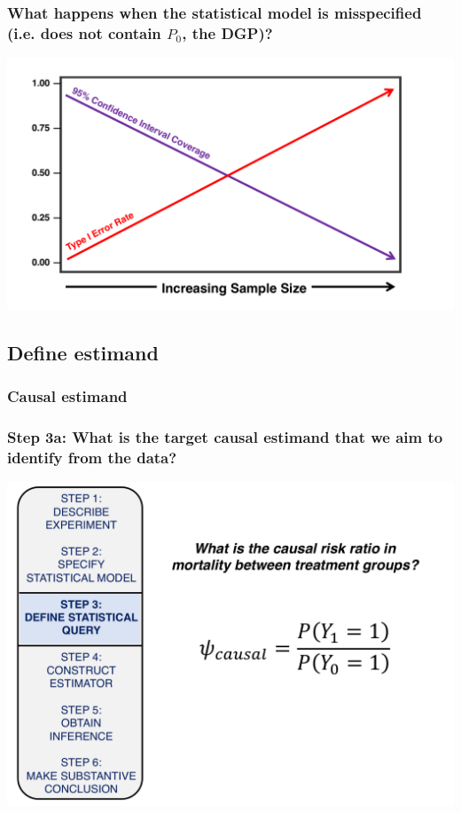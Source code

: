 \documentclass[t]{beamer}
\begin{document}
\begin{frame}
\frametitle{What happens when the statistical model is misspecified (i.e. does not contain $P_0$, the DGP)?}
\vspace{15pt}
\centering
\includegraphics[width=1.05\textwidth]{figures/misspecified.pdf}
\end{frame}

\subsection{Define estimand}

\subsubsection{Causal estimand}
\begin{frame}
  \frametitle{Step 3a: What is the target causal estimand that we aim to identify from the data?}
  \vspace{-20pt}
  \begin{center}
  \includegraphics[width = 1.05\textwidth]{figures/causalRR.pdf}
  \end{center}
\end{frame}
\end{document}
